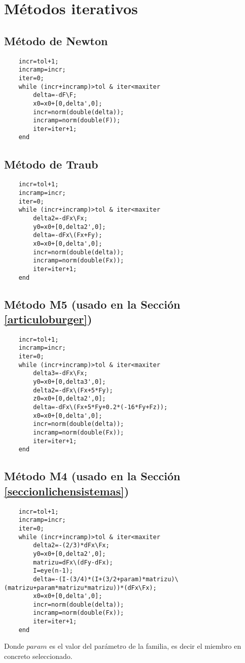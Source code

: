 \chapter{Métodos iterativos}

\section{Método de Newton}
\begin{lstlisting}
	incr=tol+1;
	incramp=incr;
	iter=0;
	while (incr+incramp)>tol & iter<maxiter
		delta=-dF\F;
		x0=x0+[0,delta',0];
		incr=norm(double(delta));
		incramp=norm(double(F));
		iter=iter+1;
	end
\end{lstlisting}

\section{Método de Traub}
\begin{lstlisting}
	incr=tol+1;
	incramp=incr;
	iter=0;
	while (incr+incramp)>tol & iter<maxiter
		delta2=-dFx\Fx;
		y0=x0+[0,delta2',0];
		delta=-dFx\(Fx+Fy);
		x0=x0+[0,delta',0];
		incr=norm(double(delta));
		incramp=norm(double(Fx));
		iter=iter+1;
	end
\end{lstlisting}

\section{Método M5 (usado en la Sección \ref{articuloburger})}
\begin{lstlisting}
	incr=tol+1;
	incramp=incr;
	iter=0;
	while (incr+incramp)>tol & iter<maxiter
		delta3=-dFx\Fx;
		y0=x0+[0,delta3',0];
		delta2=-dFx\(Fx+5*Fy);
		z0=x0+[0,delta2',0];
		delta=-dFx\(Fx+5*Fy+0.2*(-16*Fy+Fz));
		x0=x0+[0,delta',0];
		incr=norm(double(delta));
		incramp=norm(double(Fx));
		iter=iter+1;
	end
\end{lstlisting}

\section{Método M4 (usado en la Sección \ref{seccionlichensistemas})}
\begin{lstlisting}
	incr=tol+1;
	incramp=incr;
	iter=0;
	while (incr+incramp)>tol & iter<maxiter
		delta2=-(2/3)*dFx\Fx;
		y0=x0+[0,delta2',0];
		matrizu=dFx\(dFy-dFx);
		I=eye(n-1);
		delta=-(I-(3/4)*(I+(3/2+param)*matrizu)\(matrizu+param*matrizu*matrizu))*(dFx\Fx);
		x0=x0+[0,delta',0];
		incr=norm(double(delta));
		incramp=norm(double(Fx));
		iter=iter+1;
	end
\end{lstlisting}
Donde $param$ es el valor del parámetro de la familia, es decir el miembro en concreto seleccionado.

